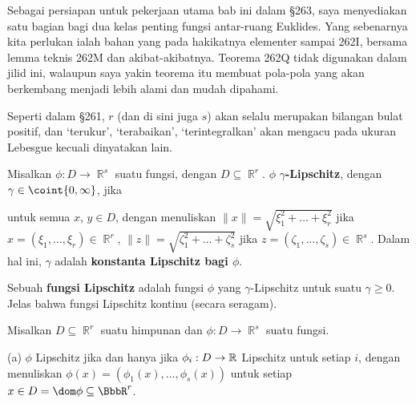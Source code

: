 
\def\dist{\mathop{\text{dist}}}

\def\chaptername{Perubahan variabel dalam integral}
\def\sectionname{Fungsi Lipschitz dan fungsi terdiferensialkan}


Sebagai persiapan untuk pekerjaan utama bab ini dalam \S263, saya
menyediakan satu bagian bagi dua kelas penting fungsi antar-ruang Euklides.
Yang sebenarnya kita perlukan ialah bahan yang pada hakikatnya elementer
sampai 262I, bersama lemma teknis 262M dan akibat-akibatnya.   Teorema
262Q tidak digunakan dalam jilid ini, walaupun saya yakin teorema itu
membuat pola-pola yang akan berkembang menjadi lebih alami dan mudah dipahami.

Seperti dalam \S261, $r$ (dan di sini juga $s$) akan selalu merupakan
bilangan bulat positif, dan `terukur', `terabaikan', `terintegralkan' akan
mengacu pada ukuran Lebesgue kecuali dinyatakan lain.

 Misalkan
$\phi:D\to\BbbR^s$ suatu fungsi, dengan $D\subseteq\BbbR^r$.   
$\phi$ {\bf $\gamma$-Lipschitz}, dengan
$\gamma\in\coint{0,\infty}$, jika


\noindent untuk semua $x$, $y\in D$, dengan menuliskan
$\|x\|=\sqrt{\xi_1^2+\ldots+\xi_r^2}$ jika
$x=(\xi_1,\ldots,\xi_r)\in\BbbR^r$,
$\|z\|=\sqrt{\zeta_1^2+\ldots+\zeta_s^2}$ jika
$z=(\zeta_1,\ldots,\zeta_s)\in\BbbR^s$.   Dalam hal ini, $\gamma$ adalah
{\bf konstanta Lipschitz bagi $\phi$}.

Sebuah {\bf fungsi Lipschitz} adalah fungsi $\phi$ yang
$\gamma$-Lipschitz untuk suatu $\gamma\ge 0$.
Jelas bahwa fungsi Lipschitz kontinu (secara seragam).

 Misalkan $D\subseteq\BbbR^r$ suatu himpunan dan
$\phi:D\to\BbbR^s$ suatu fungsi.

(a)  $\phi$ Lipschitz jika dan hanya jika $\phi_i:D\to\Bbb R$
Lipschitz untuk setiap $i$, dengan menuliskan
$\phi(x)=(\phi_1(x),\ldots,\phi_s(x))$ untuk setiap $x\in
D=\dom\phi\subseteq\BbbR^r$.


